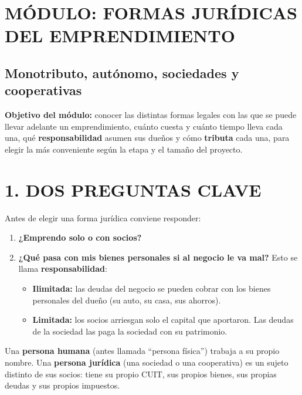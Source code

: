 \clearpage
\section*{MÓDULO: FORMAS JURÍDICAS DEL EMPRENDIMIENTO}
\subsection*{Monotributo, autónomo, sociedades y cooperativas}

\begin{recuadro}
\textbf{Objetivo del módulo:} conocer las distintas formas legales con las que se puede llevar
adelante un emprendimiento, cuánto cuesta y cuánto tiempo lleva cada una, qué
\textbf{responsabilidad} asumen sus dueños y cómo \textbf{tributa} cada una, para elegir la
más conveniente según la etapa y el tamaño del proyecto.
\end{recuadro}

\section*{1. DOS PREGUNTAS CLAVE}

Antes de elegir una forma jurídica conviene responder:
\begin{enumerate}
  \item \textbf{¿Emprendo solo o con socios?}
  \item \textbf{¿Qué pasa con mis bienes personales si al negocio le va mal?} Esto se llama
        \textbf{responsabilidad}:
  \begin{itemize}
    \item \textbf{Ilimitada:} las deudas del negocio se pueden cobrar con los bienes
          personales del dueño (su auto, su casa, sus ahorros).
    \item \textbf{Limitada:} los socios arriesgan solo el capital que aportaron. Las deudas
          de la sociedad las paga la sociedad con su patrimonio.
  \end{itemize}
\end{enumerate}

Una \textbf{persona humana} (antes llamada ``persona física'') trabaja a su propio nombre. Una
\textbf{persona jurídica} (una sociedad o una cooperativa) es un sujeto distinto de sus socios:
tiene su propio CUIT, sus propios bienes, sus propias deudas y sus propios impuestos.

